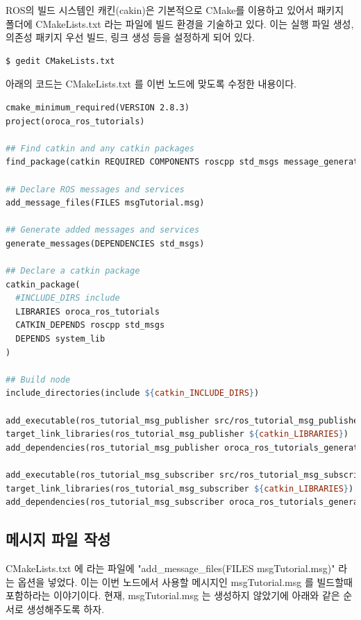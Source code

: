 ROS의 빌드 시스템인 캐킨(cakin)은 기본적으로 CMake를 이용하고 있어서 패키지 폴더에 CMakeLists.txt 라는 파일에 빌드 환경을 기술하고 있다. 이는 실행 파일 생성, 의존성 패키지 우선 빌드, 링크 생성 등을 설정하게 되어 있다.

\begin{lstlisting}[language=bash]
$ gedit CMakeLists.txt 
\end{lstlisting}

아래의 코드는 CMakeLists.txt 를 이번 노드에 맞도록 수정한 내용이다.

\begin{lstlisting}[language=make]
cmake_minimum_required(VERSION 2.8.3)
project(oroca_ros_tutorials)

## Find catkin and any catkin packages
find_package(catkin REQUIRED COMPONENTS roscpp std_msgs message_generation)

## Declare ROS messages and services
add_message_files(FILES msgTutorial.msg)

## Generate added messages and services
generate_messages(DEPENDENCIES std_msgs)

## Declare a catkin package
catkin_package(
  #INCLUDE_DIRS include
  LIBRARIES oroca_ros_tutorials
  CATKIN_DEPENDS roscpp std_msgs
  DEPENDS system_lib
)

## Build node
include_directories(include ${catkin_INCLUDE_DIRS})

add_executable(ros_tutorial_msg_publisher src/ros_tutorial_msg_publisher.cpp)
target_link_libraries(ros_tutorial_msg_publisher ${catkin_LIBRARIES})
add_dependencies(ros_tutorial_msg_publisher oroca_ros_tutorials_generate_messages_cpp)

add_executable(ros_tutorial_msg_subscriber src/ros_tutorial_msg_subscriber.cpp)
target_link_libraries(ros_tutorial_msg_subscriber ${catkin_LIBRARIES})
add_dependencies(ros_tutorial_msg_subscriber oroca_ros_tutorials_generate_messages_cpp)
\end{lstlisting}

\subsection{메시지 파일 작성}

CMakeLists.txt 에 라는 파일에 "add\_message\_files(FILES msgTutorial.msg)" 라는 옵션을 넣었다. 이는 이번 노드에서 사용할 메시지인 msgTutorial.msg 를 빌드할때 포함하라는 이야기이다. 현재, msgTutorial.msg 는 생성하지 않았기에 아래와 같은 순서로 생성해주도록 하자.

